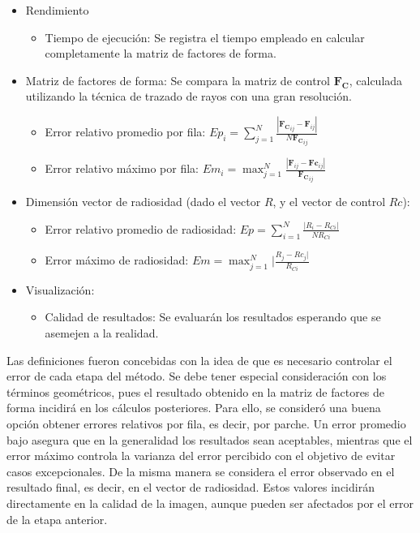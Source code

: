 \begin{itemize}
	\item Rendimiento
		\begin{itemize}
			\item Tiempo de ejecución: Se registra el tiempo empleado en calcular completamente la matriz de factores de forma.
		\end{itemize}
	\item Matriz de factores de forma: Se compara la matriz de control $\mathbf{F_{C}}$, calculada utilizando la técnica de trazado de rayos con una gran resolución.
		\begin{itemize}
			\item Error relativo promedio por fila: $Ep_{i} = \sum_{j=1}^{N} \frac{|\mathbf{F_{C}}_{ij} -\mathbf{F}_{ij}|}{N \mathbf{F_{C}}_{ij}}$
			\item Error relativo máximo por fila: $Em_{i} = \max_{j=1}^{N}\frac{|\mathbf{F}_{ij} -\mathbf{Fc}_{ij}|}{\mathbf{F_{C}}_{ij}}$
		\end{itemize}
	\item Dimensión vector de radiosidad (dado el vector $R$, y el vector de control $Rc$):
	\begin{itemize}
		\item Error relativo promedio de radiosidad: $Ep = \sum_{i=1}^{N} \frac{|R_{i}-R_{Ci}|}{N R_{Ci}}$
		\item Error máximo de radiosidad: $Em = \max_{j=1}^{N}|\frac{R_{j} -Rc_{j}|}{R_{Ci}}$
	\end{itemize}
\item Visualización:
	\begin{itemize}
		\item Calidad de resultados: Se evaluarán los resultados esperando que se asemejen a la realidad.
	\end{itemize}
\end{itemize}

Las definiciones fueron concebidas con la idea de que es necesario controlar el error de cada etapa del método. Se debe tener especial consideración con los términos geométricos, pues el resultado obtenido en la matriz de factores de forma incidirá en los cálculos posteriores. Para ello, se consideró una buena opción obtener errores relativos por fila, es decir, por parche. Un error promedio bajo asegura que en la generalidad los resultados sean aceptables, mientras que el error máximo controla la varianza del error percibido con el objetivo de evitar casos excepcionales. De la misma manera se considera el error observado en el resultado final, es decir, en el vector de radiosidad. Estos valores incidirán directamente en la calidad de la imagen, aunque pueden ser afectados por el error de la etapa anterior.

